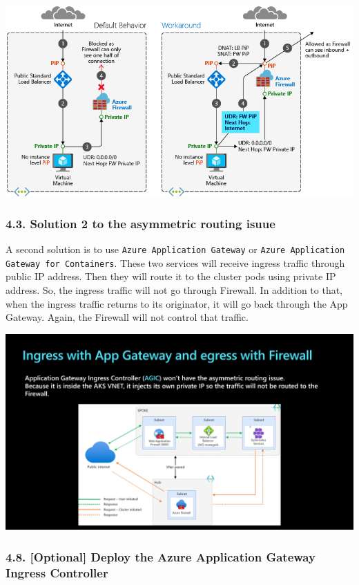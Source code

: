 \documentclass[
]{article}
\newcommand{\passthrough}[1]{#1}
\begin{document}
\includegraphics{images/65_aks_egress_lb_natgw_udr__udr-issue.png}

\hypertarget{solution-2-to-the-asymmetric-routing-isuue}{%
\subsubsection{4.3. Solution 2 to the asymmetric routing
isuue}\label{solution-2-to-the-asymmetric-routing-isuue}}

A second solution is to use
\passthrough{\lstinline!Azure Application Gateway!} or
\passthrough{\lstinline!Azure Application Gateway for Containers!}.
These two services will receive ingress traffic through public IP
address. Then they will route it to the cluster pods using private IP
address. So, the ingress traffic will not go through Firewall. In
addition to that, when the ingress traffic returns to its originator, it
will go back through the App Gateway. Again, the Firewall will not
control that traffic.

\includegraphics{images/65_aks_egress_lb_natgw_udr__udr-solution.png}

\hypertarget{optional-deploy-the-azure-application-gateway-ingress-controller}{%
\subsubsection{4.8. {[}Optional{]} Deploy the Azure Application Gateway
Ingress
Controller}\label{optional-deploy-the-azure-application-gateway-ingress-controller}}
\end{document}
